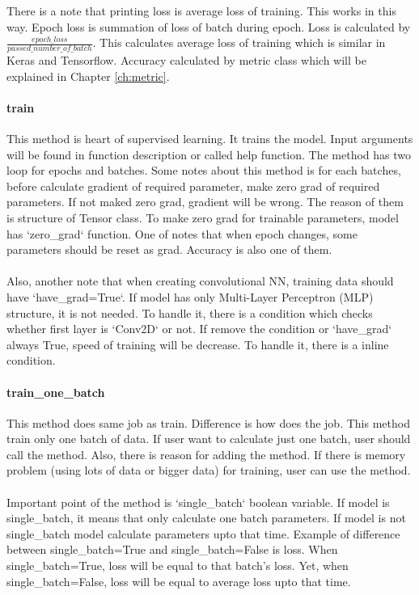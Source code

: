 \documentclass[12pt]{report}
\begin{document}
There is a note that printing loss is average loss of training. This works in this way. Epoch loss is summation of loss of batch during epoch. Loss is calculated by $ \frac{epoch\_loss}{passed\_number\_of\_batch}$. This calculates average loss of training which is similar in Keras and Tensorflow. Accuracy calculated by metric class which will be explained in Chapter \ref{ch:metric}.

\paragraph{train}
This method is heart of supervised learning. It trains the model. Input arguments will be found in function description or called help function. The method has two loop for epochs and batches. Some notes about this method is for each batches, before calculate gradient of required parameter, make zero grad of required parameters. If not maked zero grad, gradient will be wrong. The reason of them is structure of Tensor class. To make zero grad for trainable parameters, model has `zero\_grad` function. One of notes that when epoch changes, some parameters should be reset as grad. Accuracy is also one of them. 

\paragraph{}
Also, another note that when creating convolutional NN, training data should have `have\_grad=True`. If model has only Multi-Layer Perceptron (MLP) structure, it is not needed. To handle it, there is a condition which checks whether first layer is `Conv2D` or not. If remove the condition or `have\_grad` always True, speed of training will be decrease. To handle it, there is a inline condition.

\paragraph{train\_one\_batch}
This method does same job as train. Difference is how does the job. This method train only one batch of data. If user want to calculate just one batch, user should call the method. Also, there is reason for adding the method. If there is memory problem (using lots of data or bigger data) for training, user can use the method.

\paragraph{}
Important point of the method is `single\_batch` boolean variable. If model is single\_batch, it means that only calculate one batch parameters. If model is not single\_batch model calculate parameters upto that time. Example of difference between single\_batch=True and single\_batch=False is loss. When single\_batch=True, loss will be equal to that batch's loss. Yet, when single\_batch=False, loss will be equal to average loss upto that time. 
\end{document}
